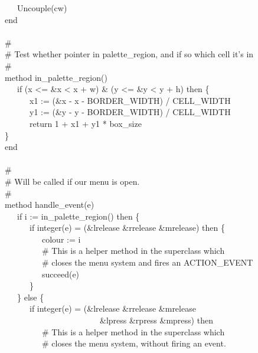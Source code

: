 {\>   \ \ \ Uncouple(cw) \\
\>   end \\
\ \\
\>   \# \\
\>   \# Test whether pointer in palette\_region, and if so which cell it's in \\
\>   \# \\
\>   method in\_palette\_region() \\
\>   \ \ \ if (x {\textless}= \&x {\textless} x + w) \& (y {\textless}= \&y {\textless} y + h)
then \{ \\
\>   \ \ \ \ \ \ x1 := (\&x - x - BORDER\_WIDTH) / CELL\_WIDTH \\
\>   \ \ \ \ \ \ y1 := (\&y - y - BORDER\_WIDTH) / CELL\_WIDTH \\
\>   \ \ \ \ \ \ return 1 + x1 + y1 * box\_size \\
\>\>   \} \\
\>   end \\
\ \\
\>   \# \\
\>   \# Will be called if our menu is open. \\
\>   \# \\
\>   method handle\_event(e) \\
\>   \ \ \ if i := in\_palette\_region() then \{ \\
\>   \ \ \ \ \ \ if integer(e) = (\&lrelease {\textbar} \&rrelease {\textbar}
                                  \&mrelease) then \{ \\
\>   \ \ \ \ \ \ \ \ \ colour := i \\
\>   \ \ \ \ \ \ \ \ \ \# This is a helper method in the superclass which \\
\>   \ \ \ \ \ \ \ \ \ \# closes the menu system and fires an ACTION\_EVENT \\
\>   \ \ \ \ \ \ \ \ \ succeed(e) \\
\>   \ \ \ \ \ \ \} \\
\>   \ \ \ \} else \{ \\
\>   \ \ \ \ \ \ if integer(e) = (\&lrelease {\textbar} \&rrelease
{\textbar} \&mrelease {\textbar} \\
\>   \ \ \ \ \ \ \ \ \ \ \ \ \ \ \ \ \ \ \ \ \ \ \ \&lpress {\textbar}
\&rpress {\textbar} \&mpress) then \\
\>   \ \ \ \ \ \ \ \ \ \# This is a helper method in the superclass
which \\
\>   \ \ \ \ \ \ \ \ \ \# closes the menu system, without firing an
event. \\
}
